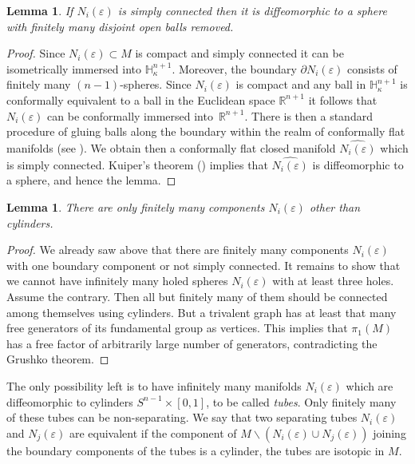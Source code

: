 \documentclass[10pt]{amsart}
\let\moins\smallsetminus
\newtheorem{lemma}[theorem]{Lemma}
\theoremstyle{definition}
\theoremstyle{remark}
\numberwithin{equation}{section}
\begin{document}
\begin{lemma}\label{sc}
If $N_i(\varepsilon)$ is simply connected then it is diffeomorphic to a
sphere with finitely many disjoint open balls removed.
\end{lemma}
\begin{proof}
Since $N_i(\varepsilon)\subset M$ is
compact and simply connected it can be isometrically immersed into
$\mathbb H_{\kappa}^{n+1}$. Moreover, the boundary
$\partial N_i(\varepsilon)$ consists of finitely many $(n-1)$-spheres.
Since $N_i(\varepsilon)$ is compact and any ball in $\mathbb H_{\kappa}^{n+1}$
is conformally equivalent to a ball in the Euclidean space
$\mathbb R^{n+1}$ it follows that $N_i(\varepsilon)$ can be conformally immersed into~$\mathbb R^{n+1}$.
There is then a standard procedure of gluing balls
along the boundary within the realm of conformally flat
manifolds (see \cite[\S2]{Pi}). We obtain then a conformally flat
closed manifold $\widehat{N_i(\varepsilon)}$
which is simply connected. Kuiper's theorem (\cite{Ku1})
implies that $\widehat{N_i(\varepsilon)}$
is diffeomorphic to a sphere, and hence the lemma.
\end{proof}

\begin{lemma}
There are only finitely many components
$N_i(\varepsilon)$ other than cylinders.
\end{lemma}
\begin{proof}
We already saw above that there are finitely
many components $N_i(\varepsilon)$ with one boundary component
or not simply connected. It remains to show that we cannot have
infinitely many holed spheres $N_i(\varepsilon)$
with at least three holes. Assume the contrary.
Then all but finitely many of them should be connected among themselves
using cylinders. But a trivalent graph has at least
that many free generators of its fundamental group as vertices.
This implies that $\pi_1(M)$ has a free factor of
arbitrarily large number of generators, contradicting the
Grushko theorem.
\end{proof}

The only possibility left is to
have infinitely many manifolds $N_i(\varepsilon)$ which are
diffeomorphic to cylinders $S^{n-1}\times [0,1]$, to be called \emph{tubes}.
Only finitely many of these tubes can be non-separating.
We say that two separating tubes $N_i(\varepsilon)$ and $N_j(\varepsilon)$
are equivalent if the component of
$M\moins (N_i(\varepsilon)\cup N_j(\varepsilon))$ joining
the boundary components of the tubes is a cylinder, \ie the tubes are isotopic in $M$.
\end{document}
